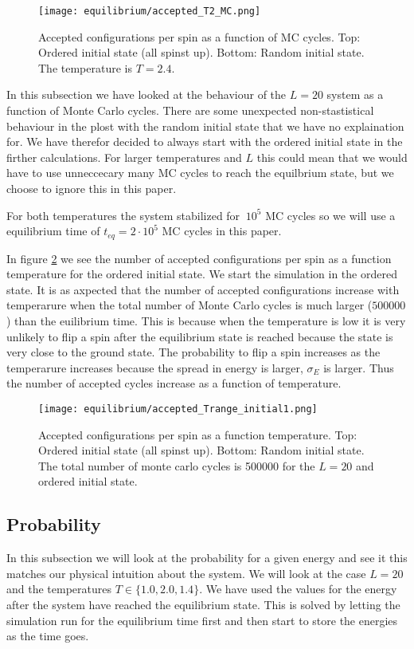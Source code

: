 \documentclass[11pt,a4wide]{article}
\begin{document}
\begin{figure}[htp]
\texttt{[image: equilibrium/accepted\_T2\_MC.png]}
\caption{Accepted configurations per spin as a function of MC cycles. Top: Ordered initial state (all spinst up). Bottom: Random initial state. The temperature is $T=2.4$.}
\centering
\label{fig:  accepted T2}
\end{figure}



In this subsection we have looked at the behaviour of the $L=20$ system as a function of Monte Carlo cycles. There are some unexpected non-stastistical behaviour in the plost with the random initial state that we have no explaination for. We have therefor decided to always start with the ordered initial state in the firther calculations. For larger temperatures and $L$ this could mean that we would have to use unneccecary many MC cycles to reach the equilbrium state, but we choose to ignore this in this paper. 

For both temperatures the system stabilized for $~10^5$ MC cycles so we will use a equilibrium time of $t_{eq} = 2\cdot10^5$ MC cycles in this paper. 

In figure \ref{fig:  accepted Trange} we see the number of accepted configurations per spin as a function temperature for the ordered initial state. We start the simulation in the ordered state. It is as axpected that the number of accepted configurations increase with temperarure when the total number of Monte Carlo cycles is much larger ($500000$) than the euilibrium time. This is because when the temperature is low it is very unlikely to flip a spin after the equilibrium state is reached because the state is very close to the ground state. The probability to flip a spin increases as the temperarure increases because the spread in energy is larger, $\sigma_E$ is larger. Thus the number of accepted cycles increase as a function of temperature.

\begin{figure}[htp]
\texttt{[image: equilibrium/accepted\_Trange\_initial1.png]}
\caption{Accepted configurations per spin as a function temperature. Top: Ordered initial state (all spinst up). Bottom: Random initial state. The total number of monte carlo cycles is 500000 for the $L=20$ and ordered initial state. }
\centering
\label{fig:  accepted Trange}
\end{figure}

\subsection{Probability}
In this subsection we will look at the probability for a given energy and see it this matches our physical intuition about the system. We will look at the case $L=20$ and the temperatures $T\in \{1.0, 2.0, 1.4\}$. We have used the values for the energy after the system have reached the equilibrium state. This is solved by letting the simulation run for the equilibrium time first and then start to store the energies as the time goes. 
\end{document}
